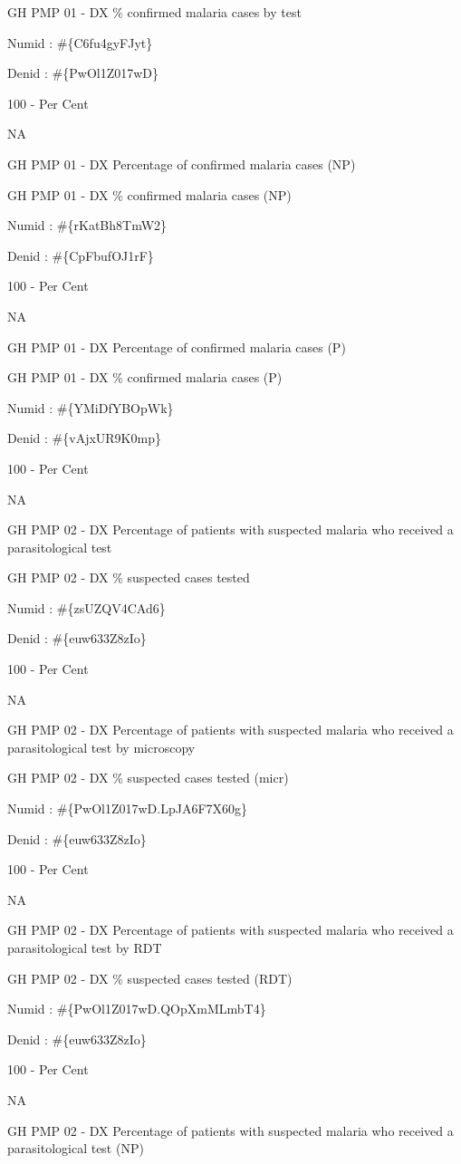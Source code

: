 \documentclass[]{book}
\begin{document}
GH PMP 01 - DX \% confirmed malaria cases by test

Numid : \#\{C6fu4gyFJyt\}

Denid : \#\{PwOl1Z017wD\}

100 - Per Cent

NA

GH PMP 01 - DX Percentage of confirmed malaria cases (NP)

GH PMP 01 - DX \% confirmed malaria cases (NP)

Numid : \#\{rKatBh8TmW2\}

Denid : \#\{CpFbufOJ1rF\}

100 - Per Cent

NA

GH PMP 01 - DX Percentage of confirmed malaria cases (P)

GH PMP 01 - DX \% confirmed malaria cases (P)

Numid : \#\{YMiDfYBOpWk\}

Denid : \#\{vAjxUR9K0mp\}

100 - Per Cent

NA

GH PMP 02 - DX Percentage of patients with suspected malaria who received a parasitological test

GH PMP 02 - DX \% suspected cases tested

Numid : \#\{zsUZQV4CAd6\}

Denid : \#\{euw633Z8zIo\}

100 - Per Cent

NA

GH PMP 02 - DX Percentage of patients with suspected malaria who received a parasitological test by microscopy

GH PMP 02 - DX \% suspected cases tested (micr)

Numid : \#\{PwOl1Z017wD.LpJA6F7X60g\}

Denid : \#\{euw633Z8zIo\}

100 - Per Cent

NA

GH PMP 02 - DX Percentage of patients with suspected malaria who received a parasitological test by RDT

GH PMP 02 - DX \% suspected cases tested (RDT)

Numid : \#\{PwOl1Z017wD.QOpXmMLmbT4\}

Denid : \#\{euw633Z8zIo\}

100 - Per Cent

NA

GH PMP 02 - DX Percentage of patients with suspected malaria who received a parasitological test (NP)
\end{document}
